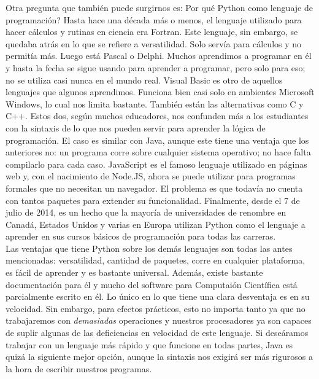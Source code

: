 \documentclass[10pt,letterpaper]{article}
\begin{document}
Otra pregunta que tambi\'en puede surgirnos es: Por qu\'e Python como lenguaje de programaci\'on? Hasta hace una d\'ecada m\'as o menos, el lenguaje utilizado para hacer c\'alculos y rutinas en ciencia era Fortran. Este lenguaje, sin embargo, se quedaba atr\'as en lo que se refiere a versatilidad. Solo serv\'ia para c\'alculos y no permit\'ia m\'as. Luego est\'a Pascal o Delphi. Muchos aprendimos a programar en \'el y hasta la fecha se sigue usando para aprender a programar, pero solo para eso; no se utiliza casi nunca en el mundo real. Visual Basic es otro de aquellos lenguajes que algunos aprendimos. Funciona bien casi solo en ambientes Microsoft Windows, lo cual nos limita bastante. Tambi\'en est\'an las alternativas como C y C++. Estos dos, seg\'un muchos educadores, nos confunden m\'as a los estudiantes con la sintaxis de lo que nos pueden servir para aprender la l\'ogica de programaci\'on. El caso es similar con Java, aunque este tiene una ventaja que los anteriores no: un programa corre sobre cualquier sistema operativo; no hace falta compilarlo para cada caso. JavaScript es el famoso lenguaje utilizado en p\'aginas web y, con el nacimiento de Node.JS, ahora se puede utilizar para programas formales que no necesitan un navegador. El problema es que todav\'ia no cuenta con tantos paquetes para extender su funcionalidad. Finalmente, desde el 7 de julio de 2014, es un hecho que la mayor\'ia de universidades de renombre en Canad\'a, Estados Unidos y varias en Europa utilizan Python como el lenguaje a aprender en sus cursos b\'asicos de programaci\'on para todas las carreras.\\

Las ventajas que tiene Python sobre los dem\'as lenguajes son todas las antes mencionadas: versatilidad, cantidad de paquetes, corre en cualquier plataforma, es f\'acil de aprender y es bastante universal. Adem\'as, existe bastante documentaci\'on para \'el y mucho del software para Computai\'on Cient\'ifica est\'a parcialmente escrito en \'el. Lo \'unico en lo que tiene una clara desventaja es en su velocidad. Sin embargo, para efectos pr\'acticos, esto no importa tanto ya que no trabajaremos con \emph{demasiadas} operaciones y nuestros procesadores ya son capaces de suplir algunas de las deficiencias en velocidad de este lenguaje. Si dese\'aramos trabajar con un lenguaje m\'as r\'apido y que funcione en todas partes, Java es quiz\'a la siguiente mejor opci\'on, aunque la sintaxis nos exigir\'a ser m\'as rigurosos a la hora de escribir nuestros programas.\\
\end{document}
